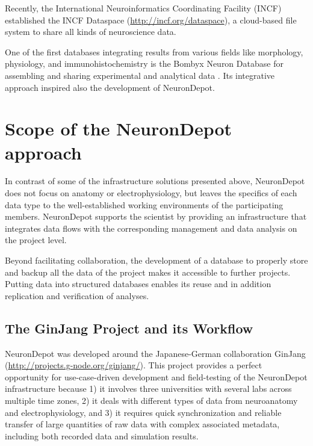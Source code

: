 \documentclass{frontiersSCNS} %
\begin{document}
Recently, the International Neuroinformatics Coordinating Facility (INCF)
established the INCF Dataspace (\url{http://incf.org/dataspace}), a cloud-based
file system to share all kinds of neuroscience data.

One of the first databases integrating results from various fields like
morphology, physiology, and immunohistochemistry is the Bombyx Neuron Database
for assembling and sharing experimental and analytical data \citep{Kazawa2008}.
Its integrative approach inspired also the development of NeuronDepot.


\section{Scope of the NeuronDepot approach}

In contrast of some of the infrastructure solutions presented above,
NeuronDepot does not focus on anatomy or electrophysiology, but leaves the
specifics of each data type to the well-established working environments of the
participating members. NeuronDepot supports the scientist by providing an
infrastructure that integrates data flows with the corresponding management and
data analysis on the project level.

Beyond facilitating collaboration, the development of a database to properly
store and backup all the data of the project makes it accessible to further
projects. Putting data into structured databases enables its reuse and in
addition replication and verification of analyses.

\subsection{The GinJang Project and its Workflow}

NeuronDepot was developed around the Japanese-German collaboration GinJang
(\url{http://projects.g-node.org/ginjang/}).
This project provides a perfect opportunity for use-case-driven development and
field-testing of the NeuronDepot infrastructure because 1) it involves three
universities with several labs across multiple time zones, 2) it deals with
different types of data from neuroanatomy and electrophysiology, and 3) it
requires quick synchronization and reliable transfer of large quantities of raw
data with complex associated metadata, including both recorded data and
simulation results.
\end{document}
